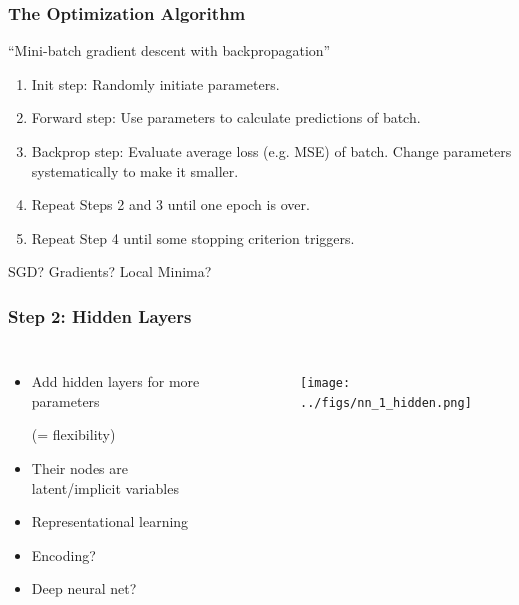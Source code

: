\documentclass[
    utf8,
    aspectratio=169
]{beamer}  %
\begin{document}
\begin{frame}
\frametitle{The Optimization Algorithm}
\begin{block}{``Mini-batch gradient descent with \alert{backpropagation}''}
	\begin{enumerate}
		\item Init step: Randomly initiate parameters.
		\item Forward step: Use parameters to calculate predictions of \alert{batch}.
		\item Backprop step: Evaluate \alert{average loss} (e.g. MSE) of batch. Change parameters systematically to make it smaller.
		\item Repeat Steps 2 and 3 until one \alert{epoch} is over.
		\item Repeat Step 4 until some stopping criterion triggers.
	\end{enumerate}
\end{block}
SGD? Gradients? Local Minima?
\end{frame}

\begin{frame}
\frametitle{Step 2: Hidden Layers}
\begin{columns}
	\begin{itemize}
		\item Add \alert{hidden layers} for more parameters 
		
		(= flexibility)
		\item Their nodes are latent/implicit variables
		\item Representational learning
		\item \small{\alert{Encoding}?}
		\item \small{\alert{Deep} neural net?}
	\end{itemize}
	\begin{example}
	\end{example}
	\begin{figure}
		\texttt{[image: ../figs/nn\_1\_hidden.png]}
	\end{figure}
\end{columns}
\end{frame}
\end{document}
